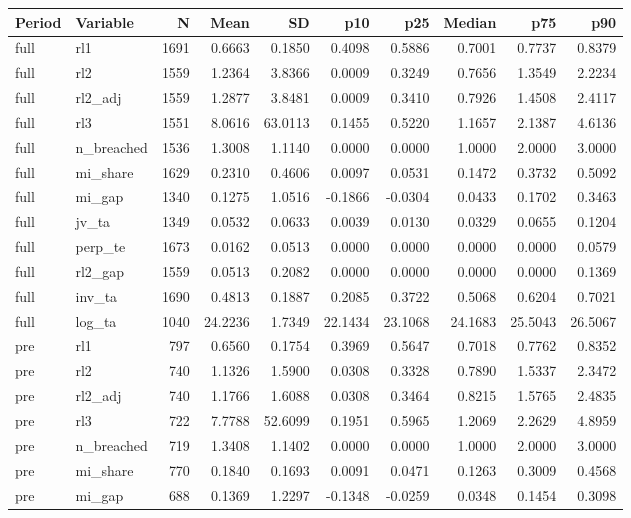 \begin{threeparttable}
\begin{tabular}{llrrrrrrrr}
\toprule
Period & Variable & N & Mean & SD & p10 & p25 & Median & p75 & p90 \\
\midrule
full & rl1 & 1691 & 0.6663 & 0.1850 & 0.4098 & 0.5886 & 0.7001 & 0.7737 & 0.8379 \\
full & rl2 & 1559 & 1.2364 & 3.8366 & 0.0009 & 0.3249 & 0.7656 & 1.3549 & 2.2234 \\
full & rl2\_adj & 1559 & 1.2877 & 3.8481 & 0.0009 & 0.3410 & 0.7926 & 1.4508 & 2.4117 \\
full & rl3 & 1551 & 8.0616 & 63.0113 & 0.1455 & 0.5220 & 1.1657 & 2.1387 & 4.6136 \\
full & n\_breached & 1536 & 1.3008 & 1.1140 & 0.0000 & 0.0000 & 1.0000 & 2.0000 & 3.0000 \\
full & mi\_share & 1629 & 0.2310 & 0.4606 & 0.0097 & 0.0531 & 0.1472 & 0.3732 & 0.5092 \\
full & mi\_gap & 1340 & 0.1275 & 1.0516 & -0.1866 & -0.0304 & 0.0433 & 0.1702 & 0.3463 \\
full & jv\_ta & 1349 & 0.0532 & 0.0633 & 0.0039 & 0.0130 & 0.0329 & 0.0655 & 0.1204 \\
full & perp\_te & 1673 & 0.0162 & 0.0513 & 0.0000 & 0.0000 & 0.0000 & 0.0000 & 0.0579 \\
full & rl2\_gap & 1559 & 0.0513 & 0.2082 & 0.0000 & 0.0000 & 0.0000 & 0.0000 & 0.1369 \\
full & inv\_ta & 1690 & 0.4813 & 0.1887 & 0.2085 & 0.3722 & 0.5068 & 0.6204 & 0.7021 \\
full & log\_ta & 1040 & 24.2236 & 1.7349 & 22.1434 & 23.1068 & 24.1683 & 25.5043 & 26.5067 \\
pre & rl1 & 797 & 0.6560 & 0.1754 & 0.3969 & 0.5647 & 0.7018 & 0.7762 & 0.8352 \\
pre & rl2 & 740 & 1.1326 & 1.5900 & 0.0308 & 0.3328 & 0.7890 & 1.5337 & 2.3472 \\
pre & rl2\_adj & 740 & 1.1766 & 1.6088 & 0.0308 & 0.3464 & 0.8215 & 1.5765 & 2.4835 \\
pre & rl3 & 722 & 7.7788 & 52.6099 & 0.1951 & 0.5965 & 1.2069 & 2.2629 & 4.8959 \\
pre & n\_breached & 719 & 1.3408 & 1.1402 & 0.0000 & 0.0000 & 1.0000 & 2.0000 & 3.0000 \\
pre & mi\_share & 770 & 0.1840 & 0.1693 & 0.0091 & 0.0471 & 0.1263 & 0.3009 & 0.4568 \\
pre & mi\_gap & 688 & 0.1369 & 1.2297 & -0.1348 & -0.0259 & 0.0348 & 0.1454 & 0.3098 \\

\end{tabular}
\end{threeparttable}

